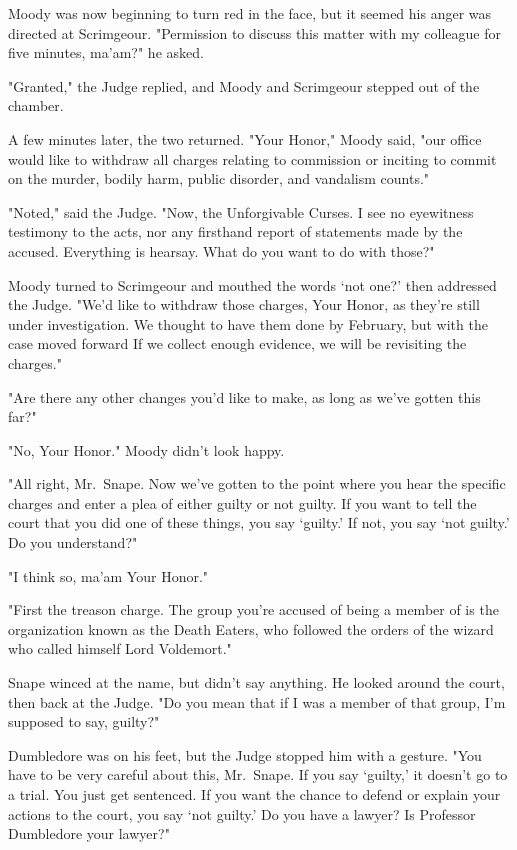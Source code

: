 Moody was now beginning to turn red in the face, but it seemed his anger was directed at Scrimgeour. "Permission to discuss this matter with my colleague for five minutes, ma'am?" he asked.

"Granted," the Judge replied, and Moody and Scrimgeour stepped out of the chamber.

A few minutes later, the two returned. "Your Honor," Moody said, "our office would like to withdraw all charges relating to commission or inciting to commit on the murder, bodily harm, public disorder, and vandalism counts."

"Noted," said the Judge. "Now, the Unforgivable Curses. I see no eyewitness testimony to the acts, nor any firsthand report of statements made by the accused. Everything is hearsay. What do you want to do with those?"

Moody turned to Scrimgeour and mouthed the words `not one?' then addressed the Judge. "We'd like to withdraw those charges, Your Honor, as they're still under investigation. We thought to have them done by February, but with the case moved forward{\el} If we collect enough evidence, we will be revisiting the charges."

"Are there any other changes you'd like to make, as long as we've gotten this far?"

"No, Your Honor." Moody didn't look happy.

"All right, Mr.~Snape. Now we've gotten to the point where you hear the specific charges and enter a plea of either guilty or not guilty. If you want to tell the court that you did one of these things, you say `guilty.' If not, you say `not guilty.' Do you understand?"

"I think so, ma'am{\el} Your Honor."

"First the treason charge. The group you're accused of being a member of is the organization known as the Death Eaters, who followed the orders of the wizard who called himself Lord Voldemort."

Snape winced at the name, but didn't say anything. He looked around the court, then back at the Judge. "Do you mean that if I was a member of that{\el} group, I'm supposed to say, guilty?"

Dumbledore was on his feet, but the Judge stopped him with a gesture. "You have to be very careful about this, Mr.~Snape. If you say `guilty,' it doesn't go to a trial. You just get sentenced. If you want the chance to defend or explain your actions to the court, you say `not guilty.' Do you have a lawyer? Is Professor Dumbledore your lawyer?"

